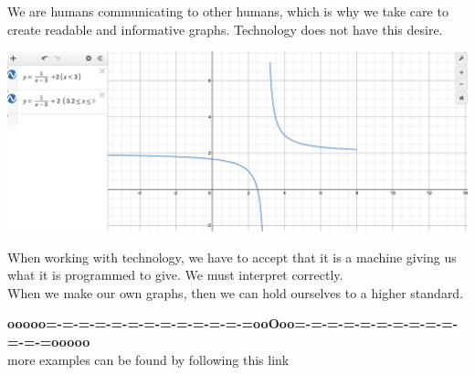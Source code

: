 \documentclass{ximera}
\begin{document}
We are humans communicating to other humans, which is why we take care to create readable and informative graphs. Technology does not have this desire.





\begin{image}
\includegraphics{pics/graph_symbols.png}
\end{image}



When working with technology, we have to accept that it is a machine giving us what it is programmed to give.  We must interpret correctly. \\


When we make our own graphs, then we can hold ourselves to a higher standard.















\begin{center}
\textbf{\textcolor{green!50!black}{ooooo=-=-=-=-=-=-=-=-=-=-=-=-=ooOoo=-=-=-=-=-=-=-=-=-=-=-=-=ooooo}} \\

more examples can be found by following this link\\ 

\end{center}
\end{document}
